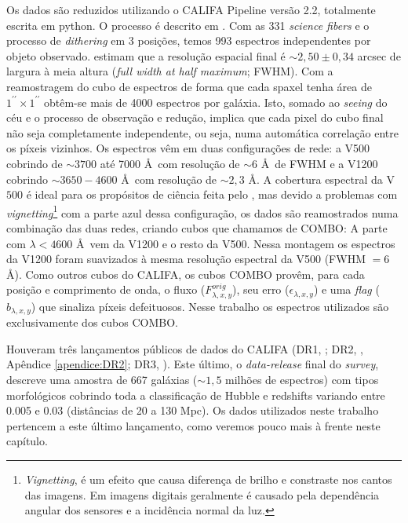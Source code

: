 Os dados são reduzidos utilizando o CALIFA Pipeline versão 2.2, totalmente escrita em {\sc python}. O processo é descrito em \citet{SFSanchez.DR3.2016}. Com as 331 {\em science fibers} e o processo de {\em dithering} em 3 posições, temos 993 espectros independentes por objeto observado. \citet{SFSanchez.DR3.2016} estimam que a resolução espacial final é $\sim2,50 \pm 0,34$ arcsec de largura à meia altura ({\em full width at half maximum}; FWHM). Com a reamostragem do cubo de espectros de forma que cada spaxel tenha área de $1^{\prime\prime} \times 1^{\prime\prime}$ obtêm-se mais de 4000 espectros por galáxia. Isto, somado ao {\em seeing} do céu e o processo de observação e redução, implica que cada pixel do cubo final não seja completamente independente, ou seja, numa automática correlação entre os píxeis vizinhos. Os espectros vêm em duas configurações de rede: a V500 cobrindo de $\sim 3700$ até 7000 \AA\ com resolução de $\sim 6$ \AA\ de FWHM e a V1200 cobrindo $\sim 3650-4600$ \AA\ com resolução de $\sim2,3$ \AA. A cobertura espectral da V$500$ é ideal para os propósitos de ciência feita pelo \starlight, mas devido a problemas com {\em vignetting}\footnote{{\em Vignetting}, é um efeito que causa diferença de brilho e constraste nos cantos das imagens. Em imagens digitais geralmente é causado pela dependência angular dos sensores e a incidência normal da luz.} com a parte azul dessa configuração, os dados são reamostrados numa combinação das duas redes, criando cubos que chamamos de COMBO: A parte com $\lambda < 4600$ \AA\ vem da V1200 e o resto da V500. Nessa montagem os espectros da V1200 foram suavizados à mesma resolução espectral da V500 (FWHM $= 6$ \AA). Como outros cubos do CALIFA, os cubos COMBO provêm, para cada posição e comprimento de onda, o fluxo ($F_{\lambda,x,y}^{orig}$), seu erro ($\epsilon_{\lambda,x,y}$) e uma {\em flag} ($b_{\lambda,x,y}$) que sinaliza píxeis defeituosos. Nesse trabalho os espectros utilizados são exclusivamente dos cubos COMBO.

Houveram três lançamentos públicos de dados do CALIFA (DR1, \citealt{Husemann.etal.2013a}; DR2, \citealt{GarciaBenito.etal.2015a}, Apêndice \ref{apendice:DR2}; DR3, \citealt{SFSanchez.DR3.2016}). Este último, o {\em data-release} final do {\em survey}, descreve uma amostra de 667 galáxias ($\sim 1,5$ milhões de espectros) com tipos morfológicos cobrindo toda a classificação de Hubble e redshifts variando entre 0.005 e 0.03 (distâncias de 20 a 130 Mpc). Os dados utilizados neste trabalho pertencem a este último lançamento, como veremos pouco mais à frente neste capítulo.



